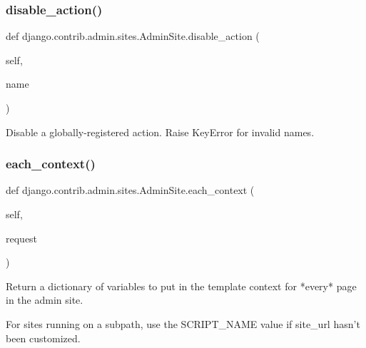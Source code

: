 \subsubsection{\texorpdfstring{disable\+\_\+action()}{disable\_action()}}
{\footnotesize\ttfamily def django.\+contrib.\+admin.\+sites.\+Admin\+Site.\+disable\+\_\+action (\begin{DoxyParamCaption}\item[{}]{self,  }\item[{}]{name }\end{DoxyParamCaption})}

\begin{DoxyVerb}Disable a globally-registered action. Raise KeyError for invalid names.
\end{DoxyVerb}
 \mbox{\label{classdjango_1_1contrib_1_1admin_1_1sites_1_1_admin_site_a9827cf8301d5677e42aa917686ac0af8}} 
\subsubsection{\texorpdfstring{each\+\_\+context()}{each\_context()}}
{\footnotesize\ttfamily def django.\+contrib.\+admin.\+sites.\+Admin\+Site.\+each\+\_\+context (\begin{DoxyParamCaption}\item[{}]{self,  }\item[{}]{request }\end{DoxyParamCaption})}

\begin{DoxyVerb}Return a dictionary of variables to put in the template context for
*every* page in the admin site.

For sites running on a subpath, use the SCRIPT_NAME value if site_url
hasn't been customized.
\end{DoxyVerb}
 \mbox{\label{classdjango_1_1contrib_1_1admin_1_1sites_1_1_admin_site_a16153802d8c5aafc65ad2befb14c8f1e}} 
